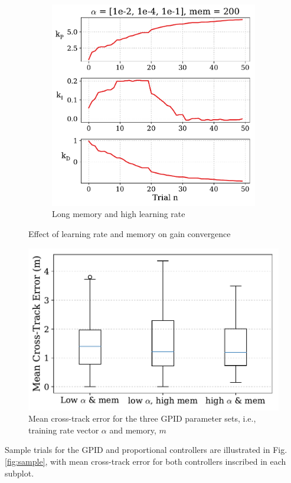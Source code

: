 \documentclass[conference]{IEEEtran}
\begin{document}
\begin{figure}[h]
\begin{subfigure}{.5\textwidth}
  \includegraphics[width=.7\linewidth]{figs/weight_05_07_t6.pdf}
  \caption{Long memory and high learning rate}
\end{subfigure}
\caption{Effect of learning rate and memory on gain convergence}
\label{fig:convergence}
\end{figure}

\begin{figure}[h]
  \centering
  \includegraphics[scale=0.5]{figs/gpid_param.pdf}
  \caption{Mean cross-track error for the three GPID parameter sets, i.e., training rate vector $\alpha$ and memory, $m$}
  \label{fig:GPID_param}
\end{figure}

Sample trials for the GPID and proportional controllers are illustrated in Fig. \ref{fig:sample}, with mean cross-track error for both controllers inscribed in each subplot.
\end{document}
